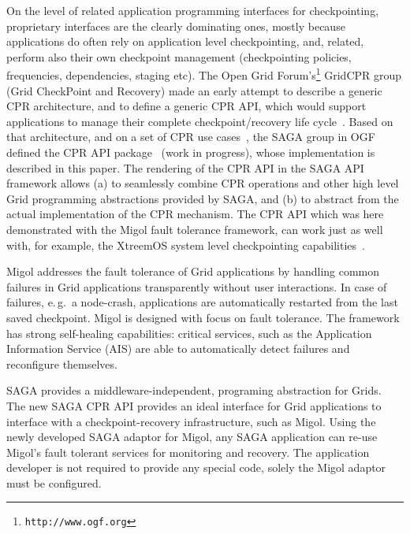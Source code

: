 \documentclass[times, 10pt,twocolumn]{article}
\begin{document}
On the level of related application programming interfaces for
checkpointing, proprietary interfaces are the clearly dominating
ones, mostly because applications do often rely on application level
checkpointing, and, related, perform also their own checkpoint
management (checkpointing policies, frequencies, dependencies, staging
etc).  The Open Grid Forum's\footnote{\texttt{http://www.ogf.org}}
GridCPR group (Grid CheckPoint and Recovery) made an early attempt to
describe a generic CPR architecture, and to define a generic CPR API,
which would support applications to manage their complete
checkpoint/recovery life cycle~\cite{ogf_cpr_arch}.  Based on that
architecture, and on a set of CPR use cases~\cite{ogf_cpr_uc}, the
SAGA group in OGF defined the CPR API package~\cite{ogf_cpr_draft}
(work in progress), whose implementation is described in this paper.
The rendering of the CPR API in the SAGA API framework allows (a) to
seamlessly combine CPR operations and other high level Grid
programming abstractions provided by SAGA, and (b) to abstract from
the actual implementation of the CPR mechanism.  The CPR API which was
here demonstrated with the Migol fault tolerance framework, can work
just as well with, for example, the XtreemOS system level
checkpointing capabilities~\cite{xtreemos_cpr}.

% 



Migol addresses the fault tolerance of Grid applications by handling common failures 
in Grid applications transparently without user interactions.  In case of failures, 
e.\,g.\ a node-crash, applications are automatically restarted 
from the last saved checkpoint.   
Migol is designed with focus on fault tolerance. 
The framework has strong self-healing capabilities: critical services, 
such as the Application Information Service (AIS) are
able to automatically detect failures and reconfigure themselves. 

SAGA provides a middleware-independent, programing abstraction for Grids. The new 
SAGA CPR API provides an ideal interface for Grid applications to interface with 
a checkpoint-recovery infrastructure, such as Migol. Using the newly developed SAGA adaptor for 
Migol, any SAGA application can re-use Migol's fault tolerant services for monitoring and recovery.
The application developer is not required to provide any special code, solely the Migol adaptor must be
configured.
\end{document}
